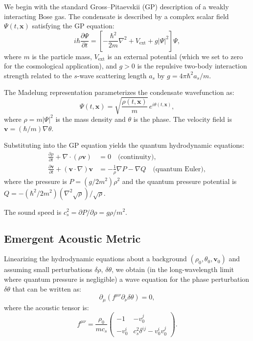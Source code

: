 \documentclass[11pt,a4paper]{article}
\theoremstyle{definition}
\begin{document}
We begin with the standard Gross--Pitaevskii (GP) description of a weakly interacting Bose gas. The condensate is described by a complex scalar field $\Psi(t, \mathbf{x})$ satisfying the GP equation:
\begin{equation}
\label{eq:GP_equation}
i\hbar \frac{\partial \Psi}{\partial t} = \left[ -\frac{\hbar^2}{2m} \nabla^2 + V_{\mathrm{ext}} + g |\Psi|^2 \right] \Psi,
\end{equation}
where $m$ is the particle mass, $V_{\mathrm{ext}}$ is an external potential (which we set to zero for the cosmological application), and $g > 0$ is the repulsive two-body interaction strength related to the $s$-wave scattering length $a_s$ by $g = 4\pi \hbar^2 a_s / m$.

The Madelung representation parameterizes the condensate wavefunction as:
\begin{equation}
\label{eq:Madelung_ansatz}
\Psi(t, \mathbf{x}) = \sqrt{\frac{\rho(t, \mathbf{x})}{m}} \, e^{i\theta(t, \mathbf{x})},
\end{equation}
where $\rho = m |\Psi|^2$ is the mass density and $\theta$ is the phase. The velocity field is $\mathbf{v} = (\hbar/m) \nabla \theta$.

Substituting into the GP equation yields the quantum hydrodynamic equations:
\begin{align}
\label{eq:continuity}
\frac{\partial \rho}{\partial t} + \nabla \cdot (\rho \mathbf{v}) &= 0 \quad \text{(continuity)}, \\
\label{eq:Euler}
\frac{\partial \mathbf{v}}{\partial t} + (\mathbf{v} \cdot \nabla) \mathbf{v} &= -\frac{1}{\rho} \nabla P - \nabla Q \quad \text{(quantum Euler)},
\end{align}
where the pressure is $P = (g/2m^2)\rho^2$ and the quantum pressure potential is $Q = -(\hbar^2/2m^2)(\nabla^2\sqrt{\rho})/\sqrt{\rho}$.

The sound speed is $c_s^2 = \partial P/\partial \rho = g\rho/m^2$.

\subsection{Emergent Acoustic Metric}
\label{sec:acoustic_metric}

Linearizing the hydrodynamic equations about a background $(\rho_0, \theta_0, \mathbf{v}_0)$ and assuming small perturbations $\delta\rho$, $\delta\theta$, we obtain (in the long-wavelength limit where quantum pressure is negligible) a wave equation for the phase perturbation $\delta\theta$ that can be written as:
\begin{equation}
\label{eq:wave_equation}
\partial_\mu \left( f^{\mu\nu} \partial_\nu \delta\theta \right) = 0,
\end{equation}
where the acoustic tensor is:
\begin{equation}
\label{eq:acoustic_tensor}
f^{\mu\nu} = \frac{\rho_0}{m c_s}
\begin{pmatrix}
-1 & -v_0^j \\
-v_0^i & c_s^2 \delta^{ij} - v_0^i v_0^j
\end{pmatrix}.
\end{equation}
\end{document}

